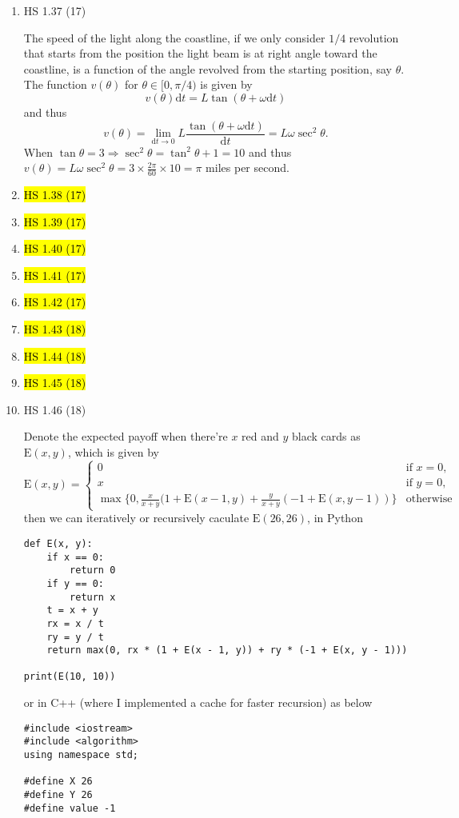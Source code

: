 \documentclass[11pt]{article}
\newcommand{\E}{\text{E}}
\renewcommand{\d}{\text{d}}
\newenvironment{note}{\begin{enumerate}[leftmargin=1em,topsep=0pt,noitemsep]}{\end{enumerate}}
\newcommand{\solution}{\boxed{\textbf{SOLUTION}}\hspace{.5em}}
\begin{document}
\begin{spacing}{1.1}
\begin{note}
\item HS 1.37 (17)

\solution The speed of the light along the coastline, if we only consider $1/4$ revolution that starts from the position the light beam is at right angle toward the coastline, is a function of the angle revolved from the starting position, say $\theta$. The function $v(\theta)$ for $\theta\in[0,\pi/4)$ is given by
$$
v(\theta)\d t = L\tan(\theta+\omega\d t)
$$
and thus
$$
v(\theta) = \lim_{\d t\to 0}L\frac{\tan(\theta+\omega\d t)}{\d t}=L\omega\sec^2\theta.
$$
When $\tan\theta = 3 \Rightarrow \sec^2\theta=\tan^2\theta+1=10$ and thus $v(\theta)=L\omega\sec^2\theta=3\times \frac{2\pi}{60}\times 10=\pi$ miles per second.

\item \hl{HS 1.38 (17)}
\item \hl{HS 1.39 (17)}
\item \hl{HS 1.40 (17)}
\item \hl{HS 1.41 (17)}
\item \hl{HS 1.42 (17)}
\item \hl{HS 1.43 (18)}
\item \hl{HS 1.44 (18)}
\item \hl{HS 1.45 (18)}

\item HS 1.46 (18)

\solution Denote the expected payoff when there're $x$ red and $y$ black cards as $\E(x,y)$, which is given by
$$
\E(x,y) = \begin{cases}
0 & \text{if }x = 0,\\
x & \text{if }y = 0,\\
\max\{0, \frac{x}{x+y}(1+\E(x-1,y) + \frac{y}{x+y}(-1+\E(x,y-1))\} & \text{otherwise}
\end{cases}
$$
then we can iteratively or recursively caculate $\E(26,26)$, in Python
\begin{verbatim}
def E(x, y):
    if x == 0:
        return 0
    if y == 0:
        return x
    t = x + y
    rx = x / t
    ry = y / t
    return max(0, rx * (1 + E(x - 1, y)) + ry * (-1 + E(x, y - 1)))

print(E(10, 10))
\end{verbatim}
or in C++ (where I implemented a cache for faster recursion) as below
\begin{verbatim}
#include <iostream>
#include <algorithm>
using namespace std;

#define X 26
#define Y 26
#define value -1


\end{verbatim}
\end{note}
\end{spacing}
\end{document}
